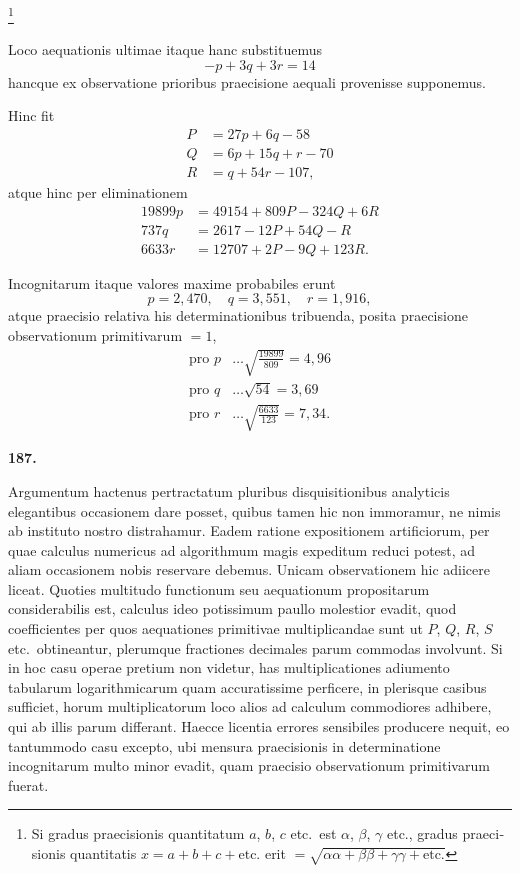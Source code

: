 \documentclass[11pt,a4paper]{article}
\begin{document}
\footnote{\foreignlanguage{ngerman}{Si gradus praecisionis quantitatum $a$, $b$, $c$ etc.\ est $\alpha$, $\beta$, $\gamma$ etc., gradus praecisionis quantitatis $x = a + b + c + \text{etc.}$ erit $= \sqrt{\alpha\alpha + \beta\beta + \gamma\gamma + \text{etc.}}$}}

Loco aequationis ultimae itaque hanc substituemus
\[
-p + 3q + 3r = 14
\]
hancque ex observatione prioribus praecisione aequali provenisse supponemus.

Hinc fit
\begin{align*}
P &= 27p + 6q - 58 \\
Q &= 6p + 15q + r - 70 \\
R &= q + 54r - 107,
\end{align*}
atque hinc per eliminationem
\begin{align*}
19899p &= 49154 + 809P - 324Q + 6R \\
737q &= 2617 - 12P + 54Q - R \\
6633r &= 12707 + 2P - 9Q + 123R.
\end{align*}

Incognitarum itaque valores maxime probabiles erunt
\[
p = 2{,}470, \quad q = 3{,}551, \quad r = 1{,}916,
\]
atque praecisio relativa his determinationibus tribuenda, posita praecisione observationum primitivarum $= 1$,
\begin{align*}
\text{pro } p &\ldots \sqrt{\tfrac{19899}{809}} = 4{,}96 \\
\text{pro } q &\ldots \sqrt{54} = 3{,}69 \\
\text{pro } r &\ldots \sqrt{\tfrac{6633}{123}} = 7{,}34.
\end{align*}

\vspace{1em}

\noindent\textbf{187.}

Argumentum hactenus pertractatum pluribus disquisitionibus analyticis elegantibus occasionem dare posset, quibus tamen hic non immoramur, ne nimis ab instituto nostro distrahamur. Eadem ratione expositionem artificiorum, per quae calculus numericus ad algorithmum magis expeditum reduci potest, ad aliam occasionem nobis reservare debemus. Unicam observationem hic adiicere liceat. Quoties multitudo functionum seu aequationum propositarum considerabilis est, calculus ideo potissimum paullo molestior evadit, quod coefficientes per quos aequationes primitivae multiplicandae sunt ut $P$, $Q$, $R$, $S$ etc.\ obtineantur, plerumque fractiones decimales parum commodas involvunt. Si in hoc casu operae pretium non videtur, has multiplicationes adiumento tabularum logarithmicarum quam accuratissime perficere, in plerisque casibus sufficiet, horum multiplicatorum loco alios ad calculum commodiores adhibere, qui ab illis parum differant. Haecce licentia errores sensibiles producere nequit, eo tantummodo casu excepto, ubi mensura praecisionis in determinatione incognitarum multo minor evadit, quam praecisio observationum primitivarum fuerat.
\end{document}
